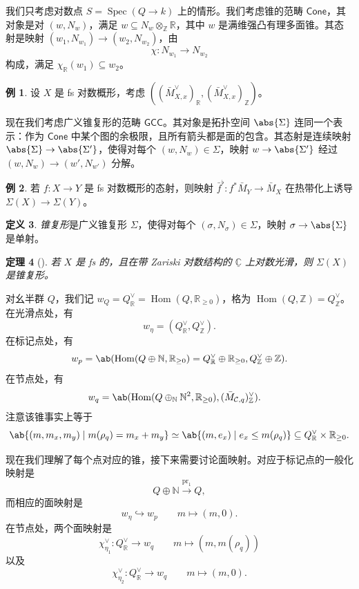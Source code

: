 \documentclass{amsart}
\newtheorem{thm}{定理}[section]
\theoremstyle{definition}
\newtheorem{defn}[thm]{定义}
\newtheorem{exm}[thm]{例}
\theoremstyle{remark}
\theoremstyle{plain}
\theoremstyle{definition}
\theoremstyle{remark}
\newcommand{\N}{\mathbb{N}}
\newcommand{\R}{\mathbb{R}}
\newcommand{\C}{\mathbb{C}}
\newcommand{\Z}{\mathbb{Z}}
\newcommand{\mc}[1]{\mathcal{#1}}
\newcommand{\on}[1]{\operatorname{#1}}
\newcommand{\ms}[1]{\mathsf{#1}}
\newcommand{\ul}[1]{\underline{#1}}
\newcommand{\1}{\mathbf{1}}
\newcommand{\2}{\mathbf{2}}
\newcommand{\3}{\mathbf{3}}
\DeclareMathOperator{\Hom}{Hom}
\DeclareMathOperator{\Spec}{Spec}
\begin{document}
我们只考虑对数点 \(S = \Spec(Q \to k)\) 上的情形。我们考虑锥的范畴 \(\ms{Cone}\)，其对象是对 \((w, N_w)\)，满足 \(w \subseteq N_w \otimes_{\Z} \R\)，其中 \(w\) 是满维强凸有理多面锥。其态射是映射 \((w_1, N_{w_1}) \to (w_2, N_{w_2})\)，由
\[ \chi \colon N_{w_1} \to N_{w_2} \]
构成，满足 \(\chi_{\R}(w_1) \subseteq w_2\)。

\begin{exm}
    设 \(X\) 是 fs 对数概形，考虑 \(( (\bar{M}_{X,x}^{\vee})_{\R}, (\bar{M}_{X,x}^{\vee})_{\Z} )\)。
\end{exm}

现在我们考虑广义锥复形的范畴 \(\ms{GCC}\)。其对象是拓扑空间 \(\abs{\Sigma}\) 连同一个表示：作为 \(\ms{Cone}\) 中某个图的余极限，且所有箭头都是面的包含。其态射是连续映射 \(\abs{\Sigma} \to \abs{\Sigma'}\)，使得对每个 \((w, N_w) \in \Sigma\)，映射 \(w \to \abs{\Sigma'}\) 经过 \((w, N_w) \to (w', N_{w'})\) 分解。

\begin{exm}
    若 \(f \colon X \to Y\) 是 fs 对数概形的态射，则映射 \(\bar{f}^{\flat} \colon f^* \bar{M}_Y \to \bar{M}_X\) 在热带化上诱导 \(\Sigma(X) \to \Sigma(Y)\)。
\end{exm}

\begin{defn}
    \textit{锥复形}是广义锥复形 \(\Sigma\)，使得对每个 \((\sigma, N_{\sigma}) \in \Sigma\)，映射 \(\sigma \to \abs{\Sigma}\) 是单射。
\end{defn}

\begin{thm}[{\cite{ACP2015}}]
    若 \(X\) 是 fs 的，且在带 Zariski 对数结构的 \(\ul{\C}\) 上对数光滑，则 \(\Sigma(X)\) 是锥复形。
\end{thm}

对幺半群 \(Q\)，我们记 \(w_Q = Q_{\R}^{\vee} = \Hom(Q, \R_{\geq 0})\)，格为 \(\Hom(Q, \Z) = Q_{\Z}^{\vee}\)。在光滑点处，有
\[ w_{\eta} = (Q_{\R}^{\vee}, Q_{\Z}^{\vee}). \]
在标记点处，有
\[ w_p = \ab(\Hom (Q \oplus \N, \R_{\geq 0}) = Q_{\R}^{\vee} \oplus \R_{\geq 0}, Q_{\Z}^{\vee}\oplus \Z). \]
在节点处，有
\begin{align*}
    w_q &= \ab(\Hom(Q \oplus_{\N} \N^2, \R_{\geq 0}), ( \bar{M}_{\mc{C}, q} )_{\Z}^{\vee}).
\end{align*}
注意该锥事实上等于
\[ \ab\{(m, m_x, m_y) \mid m(\rho_q) = m_x + m_y \} \simeq \ab\{(m, e_x) \mid e_x \leq m(\rho_q) \} \subseteq Q_{\R}^{\vee} \times \R_{\geq 0}. \]

现在我们理解了每个点对应的锥，接下来需要讨论面映射。对应于标记点的一般化映射是
\[ Q \oplus \N \xrightarrow{\on{pr}_1} Q, \]
而相应的面映射是
\[ w_{\eta} \hookrightarrow w_p \qquad m \mapsto (m,0). \]
在节点处，两个面映射是
\[ \chi_{\eta_1}^{\vee} \colon Q_{\R}^{\vee} \to w_q \qquad m \mapsto (m, m(\rho_q)) \]
以及
\[ \chi_{\eta_2}^{\vee} \colon Q_{\R}^{\vee} \to w_q \qquad m \mapsto (m, 0). \]
\end{document}
